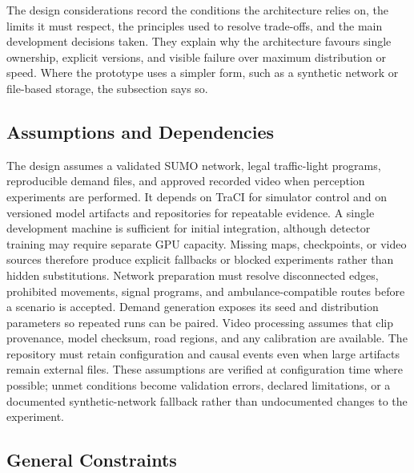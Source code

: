 The design considerations record the conditions the architecture relies on, the limits it must respect, the principles used to resolve trade-offs, and the main development decisions taken. They explain why the architecture favours single ownership, explicit versions, and visible failure over maximum distribution or speed. Where the prototype uses a simpler form, such as a synthetic network or file-based storage, the subsection says so.

\subsection{Assumptions and Dependencies}

The design assumes a validated SUMO network, legal traffic-light programs, reproducible demand files, and approved recorded video when perception experiments are performed. It depends on TraCI for simulator control and on versioned model artifacts and repositories for repeatable evidence. A single development machine is sufficient for initial integration, although detector training may require separate GPU capacity. Missing maps, checkpoints, or video sources therefore produce explicit fallbacks or blocked experiments rather than hidden substitutions. Network preparation must resolve disconnected edges, prohibited movements, signal programs, and ambulance-compatible routes before a scenario is accepted. Demand generation exposes its seed and distribution parameters so repeated runs can be paired. Video processing assumes that clip provenance, model checksum, road regions, and any calibration are available. The repository must retain configuration and causal events even when large artifacts remain external files. These assumptions are verified at configuration time where possible; unmet conditions become validation errors, declared limitations, or a documented synthetic-network fallback rather than undocumented changes to the experiment.

\subsection{General Constraints}

